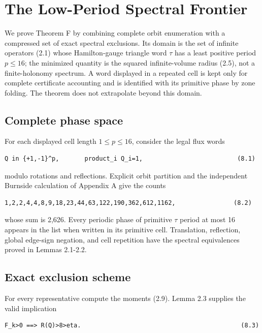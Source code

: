 \section{The Low-Period Spectral Frontier}

We prove Theorem F by combining complete orbit enumeration with a compressed
set of exact spectral exclusions. Its domain is the set of infinite operators
(2.1) whose Hamilton-gauge triangle word \(\tau\) has a least positive period
\(p\le 16\); the minimized quantity is the squared infinite-volume radius (2.5),
not a finite-holonomy spectrum. A word displayed in a repeated cell is kept
only for complete certificate accounting and is identified with its primitive
phase by zone folding. The theorem does not extrapolate beyond this domain.

\subsection{Complete phase space}

For each displayed cell length \(1\le p\le 16\), consider the legal flux words

\begin{lstlisting}[language={}]
Q in {+1,-1}^p,       product_i Q_i=1,                          (8.1)
\end{lstlisting}

modulo rotations and reflections. Explicit orbit partition and the independent
Burnside calculation of Appendix A give the counts

\begin{lstlisting}[language={}]
1,2,2,4,4,8,9,18,23,44,63,122,190,362,612,1162,                (8.2)
\end{lstlisting}

whose sum is 2,626. Every periodic phase of primitive \(\tau\) period at most 16
appears in the list when written in its primitive cell. Translation,
reflection, global edge-sign negation, and cell repetition have the spectral
equivalences proved in Lemmas 2.1-2.2.

\subsection{Exact exclusion scheme}

For every representative compute the moments (2.9). Lemma 2.3 supplies the
valid implication

\begin{lstlisting}[language={}]
F_k>0 ==> R(Q)>8>eta.                                            (8.3)
\end{lstlisting}

